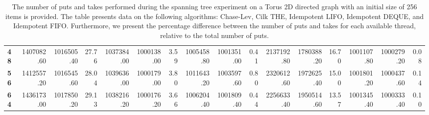 \begin{table}[!ht]
{\begin{tabular}{lrrrrrrrrrrrrrrr}
\textbf{48} & 1407082.60 & 1016505.40 &          27.76 & 1037384.00 & 1000138.00 &           3.59 &      1005458.80 & 1001351.00 &           0.41 &       2137192.80 & 1780388.20 &          16.70 &      1001107.80 & 1000279.20 &           0.08 \\
\textbf{56} & 1412557.20 & 1016545.60 &          28.04 & 1039636.00 & 1000179.00 &           3.80 &      1011643.20 & 1003597.60 &           0.80 &       2320612.60 & 1972625.40 &          15.00 &      1001801.20 & 1000437.60 &           0.14 \\
\textbf{64} & 1436173.00 & 1017850.20 &          29.13 & 1038216.20 & 1000176.20 &           3.66 &      1006204.40 & 1001809.40 &           0.44 &       2256633.40 & 1950514.60 &          13.57 &      1001345.40 & 1000333.40 &           0.10 \\
\bottomrule
\end{tabular}}
\caption{\label{difference-Torus_2D_directed-256-main-1} The number of puts and takes performed during the
    spanning tree experiment on a Torus 2D directed graph with an initial size
    of 256 items is provided. The table presents data on the
    following algorithms: Chase-Lev, Cilk THE, Idempotent LIFO, Idempotent DEQUE, and
    Idempotent FIFO. Furthermore, we present the percentage difference
    between the number of puts and takes for each available thread,
    relative to the total number of puts.}
\end{table}

